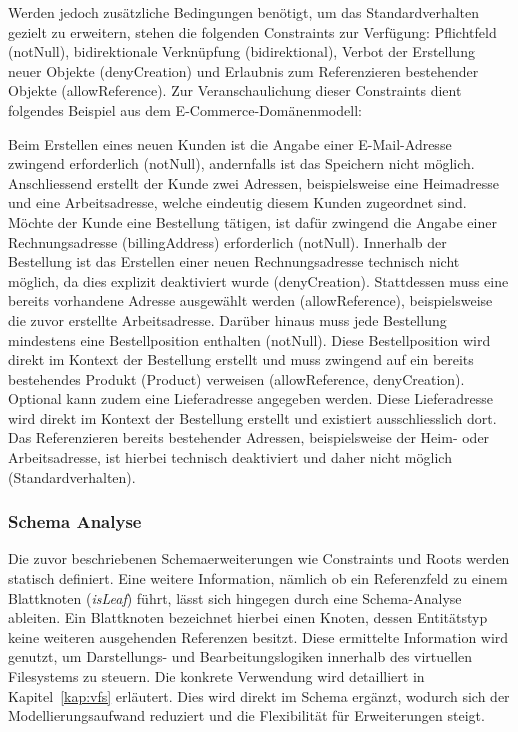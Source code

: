 Werden jedoch zusätzliche Bedingungen benötigt, um das Standardverhalten gezielt zu erweitern, stehen die folgenden Constraints zur Verfügung: Pflichtfeld (notNull), bidirektionale Verknüpfung (bidirektional), Verbot der Erstellung neuer Objekte (denyCreation) und Erlaubnis zum Referenzieren bestehender Objekte (allowReference). Zur Veranschaulichung dieser Constraints dient folgendes Beispiel aus dem E-Commerce-Domänenmodell:

Beim Erstellen eines neuen Kunden ist die Angabe einer E-Mail-Adresse zwingend erforderlich (notNull), andernfalls ist das Speichern nicht möglich. Anschliessend erstellt der Kunde zwei Adressen, beispielsweise eine Heimadresse und eine Arbeitsadresse, welche eindeutig diesem Kunden zugeordnet sind. Möchte der Kunde eine Bestellung tätigen, ist dafür zwingend die Angabe einer Rechnungsadresse (billingAddress) erforderlich (notNull). Innerhalb der Bestellung ist das Erstellen einer neuen Rechnungsadresse technisch nicht möglich, da dies explizit deaktiviert wurde (denyCreation). Stattdessen muss eine bereits vorhandene Adresse ausgewählt werden (allowReference), beispielsweise die zuvor erstellte Arbeitsadresse. Darüber hinaus muss jede Bestellung mindestens eine Bestellposition enthalten (notNull). Diese Bestellposition wird direkt im Kontext der Bestellung erstellt und muss zwingend auf ein bereits bestehendes Produkt (Product) verweisen (allowReference, denyCreation). Optional kann zudem eine Lieferadresse angegeben werden. Diese Lieferadresse wird direkt im Kontext der Bestellung erstellt und existiert ausschliesslich dort. Das Referenzieren bereits bestehender Adressen, beispielsweise der Heim- oder Arbeitsadresse, ist hierbei technisch deaktiviert und daher nicht möglich (Standardverhalten).

\subsubsection{Schema Analyse}
\label{sec:dynamischerAb}
Die zuvor beschriebenen Schemaerweiterungen wie Constraints und Roots werden statisch definiert. Eine weitere Information, nämlich ob ein Referenzfeld zu einem Blattknoten (\textit{isLeaf}) führt, lässt sich hingegen durch eine Schema-Analyse ableiten. Ein Blattknoten bezeichnet hierbei einen Knoten, dessen Entitätstyp keine weiteren ausgehenden Referenzen besitzt. Diese ermittelte Information wird genutzt, um Darstellungs- und Bearbeitungslogiken innerhalb des virtuellen Filesystems zu steuern. Die konkrete Verwendung wird detailliert in Kapitel~\ref{kap:vfs} erläutert. Dies wird direkt im Schema ergänzt, wodurch sich der Modellierungsaufwand reduziert und die Flexibilität für Erweiterungen steigt.

